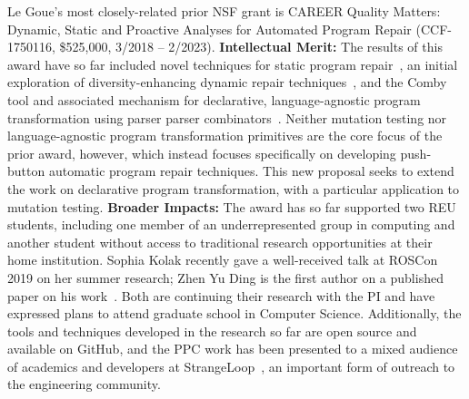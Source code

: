 Le Goue's most closely-related prior NSF grant is  CAREER
Quality Matters: Dynamic, Static and Proactive Analyses for Automated Program
Repair (CCF-1750116,  \$525,000,  3/2018 -- 2/2023).  \textbf{Intellectual
  Merit:} The results of this award have so far  
included novel techniques for static program repair~\cite{footpatch}, an initial
exploration of diversity-enhancing dynamic repair
techniques~\cite{Ding2019}, and the Comby tool and associated mechanism for
declarative, language-agnostic program transformation using parser parser
combinators~\cite{rvt-ppc}.  Neither mutation testing nor language-agnostic
program transformation primitives are the core focus of the prior award,
however, which instead focuses specifically on developing push-button automatic
program repair techniques. This new proposal seeks to extend the work on
declarative program transformation, with a particular application to mutation
testing. \textbf{Broader Impacts:} The award has so far supported two REU
students, including one member of an underrepresented group in computing and
another student without access to traditional research opportunities at their
home institution.  Sophia Kolak recently gave a well-received talk at ROSCon
2019 on her summer research; Zhen Yu Ding is the first author on a published
paper on his work~\cite{Ding2019}.  Both are continuing their research with
the PI and have expressed plans to attend graduate school in Computer Science.
Additionally, the tools and techniques developed in the research so far are open
source and available on GitHub, and the PPC work has been presented to a mixed
audience of academics and developers at StrangeLoop~\cite{strangeloop}, an
important form of outreach to the engineering community.
